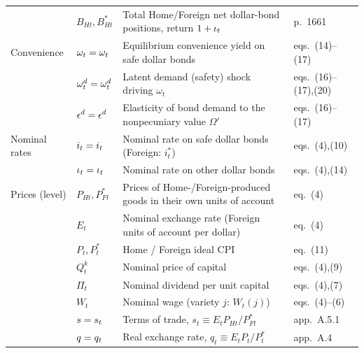 \begin{longtable}{@{}p{2.55cm} p{2.0cm} p{7.2cm} p{2.4cm}@{}}
                 & $B_{Ht},B_{Ht}^{*}$      & Total Home/Foreign net dollar-bond positions, return $1+\iota_t$               & p.\ 1661 \\
Convenience      & $\omega_t=\omega_t$         & Equilibrium convenience yield on safe dollar bonds                              & eqs.\ (14)--(17) \\
                 & $\omega^{d}_t=\omega^d_t$      & Latent demand (safety) shock driving $\omega_t$                                 & eqs.\ (16)--(17),(20) \\
                 & $\epsilon^{d}=\epsilon^d$       & Elasticity of bond demand to the nonpecuniary value $\Omega'$                   & eqs.\ (16)--(17) \\
Nominal rates    & $i_t=i_t$            & Nominal rate on safe dollar bonds (Foreign: $i_t^{*}$)                          & eqs.\ (4),(10) \\
                 & $\iota_t=\iota_t$        & Nominal rate on other dollar bonds                                              & eqs.\ (4),(14) \\
Prices (level)   & $P_{Ht},P^{*}_{Ft}$      & Prices of Home-/Foreign-produced goods in their own units of account           & eq.\ (4) \\
                 & $E_t$                    & Nominal exchange rate (Foreign units of account per dollar)                     & eq.\ (4) \\
                 & $P_t,P^{*}_t$            & Home / Foreign ideal CPI                                                        & eq.\ (11) \\
                 & $Q^k_t$                  & Nominal price of capital                                                        & eqs.\ (4),(9) \\
                 & $\Pi_t$                  & Nominal dividend per unit capital                                               & eqs.\ (4),(7) \\
                 & $W_t$                    & Nominal wage (variety $j$: $W_t(j)$)                                            & eqs.\ (4)--(6) \\
                 & $s=s_t$               & Terms of trade, $s_t\equiv E_tP_{Ht}/P^{*}_{Ft}$                                & app.\ A.5.1 \\
                 & $q=q_t$               & Real exchange rate, $q_t\equiv E_tP_t/P^{*}_t$                                  & app.\ A.4 \\

\end{longtable}
